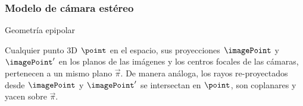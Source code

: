 \begin{frame}
\frametitle{Modelo de cámara estéreo}

\begin{block}{Geometría epipolar}



Cualquier punto 3D $\point$ en el espacio, sus proyecciones $\imagePoint$ y $\imagePoint^{\prime}$ en los planos de las imágenes y los centros focales de las cámaras, pertenecen a un mismo plano $\vec{\pi}$.
De manera análoga, los rayos re-proyectados desde $\imagePoint$ y $\imagePoint^{\prime}$ se intersectan en $\point$, son coplanares y yacen sobre $\vec{\pi}$.
\end{block}

\begin{figure}[!htb]
	\centering
	\hfill
	\centering
	\hfill
\end{figure}
\end{frame}


